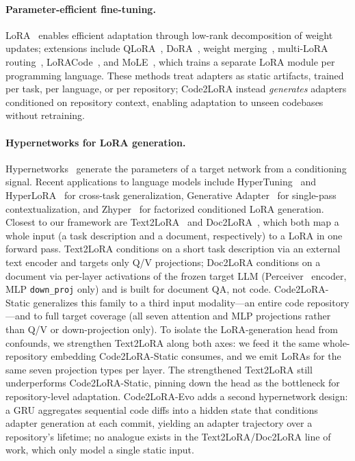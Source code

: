 \documentclass[11pt]{article}
\newcommand{\codelora}{Code2LoRA\xspace}
\newcommand{\codelorastatic}{\codelora-Static\xspace}
\newcommand{\codeloraevo}{\codelora-Evo\xspace}
\newcommand{\textlora}{Text2LoRA\xspace}
\newcommand{\doclora}{Doc2LoRA\xspace}
\begin{document}
\paragraph{Parameter-efficient fine-tuning.}
LoRA~\cite{hu2022lora} enables efficient adaptation through low-rank decomposition of weight updates; extensions include QLoRA~\cite{dettmers2023qlora}, DoRA~\cite{liu2024dora}, weight merging~\cite{yadav2024ties}, multi-LoRA routing~\cite{huang2024lorahub}, LoRACode~\cite{chaturvedi2025loracodeloraadapterscode}, and MoLE~\cite{zong2025mixlanguageexperts}, which trains a separate LoRA module per programming language.
These methods treat adapters as static artifacts, trained per task, per language, or per repository; \codelora{} instead \emph{generates} adapters conditioned on repository context, enabling adaptation to unseen codebases without retraining.

\paragraph{Hypernetworks for LoRA generation.}
Hypernetworks~\cite{ha2017hypernetworks} generate the parameters of a target network from a conditioning signal.
Recent applications to language models include HyperTuning~\cite{phang2023hypertuning} and HyperLoRA~\cite{von2024language} for cross-task generalization, Generative Adapter~\cite{chen2025generativeadapter} for single-pass contextualization, and Zhyper~\cite{abdalla2025zhyper} for factorized conditioned LoRA generation.
Closest to our framework are \textlora{}~\cite{charakorn2025text2lora} and \doclora{}~\cite{charakorn2026doctolora}, which both map a whole input (a task description and a document, respectively) to a LoRA in one forward pass.
\textlora{} conditions on a short task description via an external text encoder and targets only Q/V projections; \doclora{} conditions on a document via per-layer activations of the frozen target LLM (Perceiver~\cite{jaegle2021perceiver} encoder, MLP \texttt{down\_proj} only) and is built for document QA, not code.
\codelorastatic{} generalizes this family to a third input modality---an entire code repository---and to full target coverage (all seven attention and MLP projections rather than Q/V or down-projection only).
To isolate the LoRA-generation head from confounds, we strengthen \textlora{} along both axes: we feed it the same whole-repository embedding \codelorastatic{} consumes, and we emit LoRAs for the same seven projection types per layer.
The strengthened \textlora{} still underperforms \codelorastatic{}, pinning down the head as the bottleneck for repository-level adaptation.
\codeloraevo{} adds a second hypernetwork design: a GRU aggregates sequential code diffs into a hidden state that conditions adapter generation at each commit, yielding an adapter trajectory over a repository's lifetime; no analogue exists in the \textlora{}/\doclora{} line of work, which only model a single static input.
\end{document}
